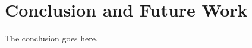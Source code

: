 \documentclass[journal]{IEEEtran}
\begin{document}
\section{Conclusion and Future Work}
The conclusion goes here.






%





%
%
%
\end{document}
